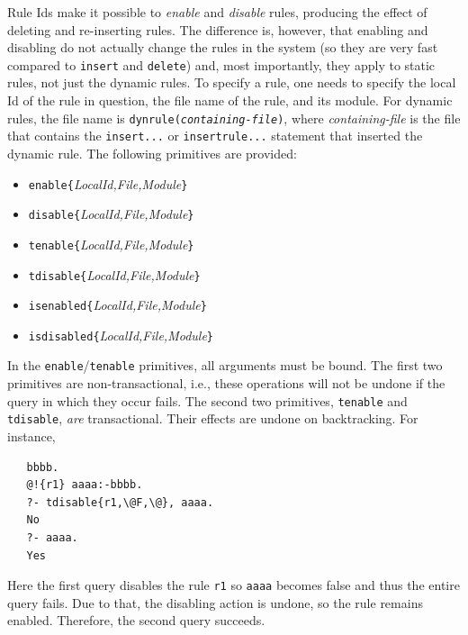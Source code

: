 \documentclass[11pt]{article}
\begin{document}
Rule Ids make it possible to \emph{enable} and \emph{disable} rules,
producing the effect of deleting and re-inserting rules.
The difference is, however, that enabling and disabling do not actually
change the rules in the system (so they are very fast compared to
\texttt{insert} and \texttt{delete}) and, most importantly, they apply to
static rules, not just the dynamic rules.  To specify a rule, one needs to
specify the local Id of the rule in question, the file name of the rule,
and its module. For dynamic rules, the file name is
\texttt{dynrule(\textnormal{\emph{containing-file}})},
where \emph{containing-file} is the file that contains the
\texttt{insert{...}} or \texttt{insertrule{...}} statement that inserted
the dynamic rule.  
The following
primitives are provided:
\begin{itemize}
\item \texttt{enable\{}\emph{LocalId,File,Module}\texttt{\}} 
\item \texttt{disable\{}\emph{LocalId,File,Module}\texttt{\}} 
\item \texttt{tenable\{}\emph{LocalId,File,Module}\texttt{\}}  
\item \texttt{tdisable\{}\emph{LocalId,File,Module}\texttt{\}}  
\item \texttt{isenabled\{}\emph{LocalId,File,Module}\texttt{\}}  
\item \texttt{isdisabled\{}\emph{LocalId,File,Module}\texttt{\}}  
\end{itemize}
In the \texttt{enable}/\texttt{tenable} primitives, all arguments must be
bound.  
The first two primitives are non-transactional, i.e., these operations will
not be undone if the query in which they occur fails.
The second two primitives, \texttt{tenable} and \texttt{tdisable},
\emph{are} transactional. Their effects are undone on backtracking. For
instance, 
\begin{verbatim}
   bbbb.
   @!{r1} aaaa:-bbbb.
   ?- tdisable{r1,\@F,\@}, aaaa.
   No
   ?- aaaa.
   Yes
\end{verbatim}
Here the first query disables the rule \texttt{r1} so \texttt{aaaa} becomes
false and thus the entire query fails. Due to that, the disabling action is
undone, so the rule remains enabled. Therefore, the second query succeeds.
\end{document}
